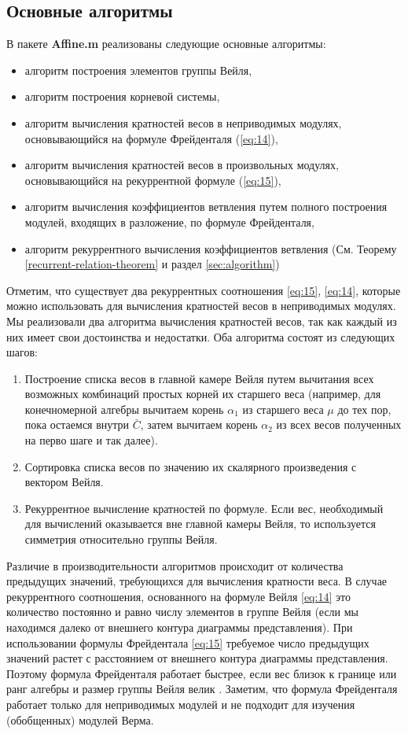 \subsection{Основные алгоритмы}
\label{sec:comp-algor}
В пакете {\bf Affine.m} реализованы следующие основные алгоритмы:
\begin{itemize}
\item алгоритм построения элементов группы Вейля,
\item алгоритм построения корневой системы,
\item алгоритм вычисления кратностей весов в неприводимых модулях, основывающийся на формуле Фрейденталя (\ref{eq:14}),
\item алгоритм вычисления кратностей весов в произвольных модулях, основывающийся на рекуррентной формуле (\ref{eq:15}),
\item алгоритм вычисления коэффициентов ветвления путем полного построения модулей, входящих в разложение, по формуле Фрейденталя,
\item алгоритм рекуррентного вычисления коэффициентов ветвления (См. Теорему \ref{recurrent-relation-theorem} и раздел \ref{sec:algorithm})
\end{itemize}

Отметим, что существует два рекуррентных соотношения \eqref{eq:15}, \eqref{eq:14}, которые можно использовать для вычисления кратностей весов в неприводимых модулях. Мы реализовали два алгоритма  вычисления кратностей весов, так как каждый из них имеет свои достоинства и недостатки.  Оба алгоритма состоят из следующих шагов:
\begin{enumerate}
\item Построение списка весов в главной камере Вейля путем вычитания всех возможных комбинаций простых корней их старшего веса (например, для конечномерной алгебры вычитаем корень  $\alpha_{1}$ из старшего веса $\mu$ до тех пор, пока остаемся внутри  $\bar C$, затем вычитаем корень $\alpha_{2}$ из всех весов полученных на перво шаге и так далее).
\item Сортировка списка весов по значению их скалярного произведения с вектором Вейля.
\item Рекуррентное вычисление кратностей по формуле. Если вес, необходимый для вычислений оказывается вне главной камеры Вейля, то используется симметрия относительно группы Вейля.
\end{enumerate}
Различие в производительности алгоритмов происходит от количества предыдущих значений, требующихся для вычисления кратности веса. В случае рекуррентного соотношения, основанного на формуле Вейля  \eqref{eq:14} это количество постоянно и равно числу элементов в группе Вейля (если мы находимся далеко от внешнего контура диаграммы представления). При использовании формулы Фрейдентала \eqref{eq:15} требуемое число предыдущих значений растет с расстоянием от внешнего контура диаграммы представления.  Поэтому формула Фрейденталя работает быстрее, если вес близок к границе или ранг алгебры и размер группы Вейля велик \cite{moody1982fast}. Заметим, что формула Фрейденталя работает только для неприводимых модулей и не подходит для изучения (обобщенных) модулей Верма.


